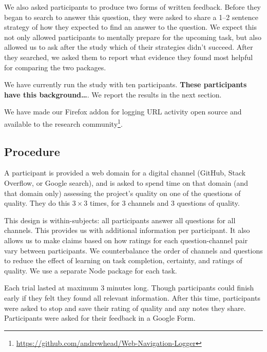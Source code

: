 We also asked participants to produce two forms of written feedback.
Before they began to search to answer this question, they were asked to share a 1--2 sentence strategy of how they expected to find an answer to the question.
We expect this not only allowed participants to mentally prepare for the upcoming task, but also allowed us to ask after the study which of their strategies didn't succeed.
After they searched, we asked them to report what evidence they found most helpful for comparing the two packages.

We have currently run the study with ten participants.
\textbf{These participants have this background\ldots{}}.
We report the results in the next section.

We have made our Firefox addon for logging URL activity open source and available to the research community\footnote{\url{https://github.com/andrewhead/Web-Navigation-Logger}}.


\fi

\subsection{Procedure}

A participant is provided a web domain for a digital channel (GitHub, Stack Overflow, or Google search), and is asked to spend time on that domain (and that domain only) assessing the project's quality on one of the questions of quality.
They do this $3\times3$ times, for 3 channels and 3 questions of quality.

This design is within-subjects: all participants answer all questions for all channels.
This provides us with additional information per participant.
It also allows us to make claims based on how ratings for each question-channel pair vary between participants.
We counterbalance the order of channels and questions to reduce the effect of learning on task completion, certainty, and ratings of quality.
We use a separate Node package for each task.

Each trial lasted at maximum 3 minutes long.
Though participants could finish early if they felt they found all relevant information.
After this time, participants were asked to stop and save their rating of quality and any notes they share.
Participants were asked for their feedback in a Google Form.

